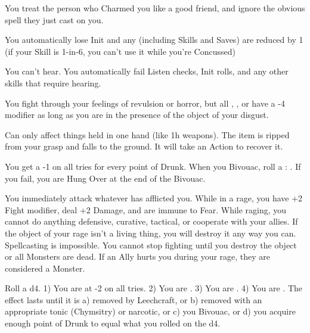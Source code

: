 {  

  You treat the person who Charmed you like a good friend, and ignore the obvious spell they just cast on you.


  You automatically lose Init and any \KNACK (including Skills and Saves) are reduced by 1 (if your Skill is 1-in-6, you can't use it while you're Concussed)


  You can't hear.  You automatically fail Listen checks, Init rolls, and any other skills that require hearing.


  You fight through your feelings of revulsion or horror, but all \RO, \RB, or \RS have a -4 modifier as long as you are in the presence of the object of your disgust.


  Can only affect things held in one hand (like 1h weapons). The item is ripped from your grasp and falls to the ground.  It will take an Action to recover it.


  You get a -1 on all \RO tries for every point of Drunk.  When you Bivouac, roll a \RS : \VIG.  If you fail, you are Hung Over at the end of the Bivouac.


  You immediately attack whatever has afflicted you. While in a rage, you have +2 Fight modifier, deal +2 Damage, and are immune to Fear. While raging, you cannot do anything defensive, curative, tactical, or cooperate with your allies. If the object of your rage isn't a living thing, you will destroy it any way you can. Spellcasting is impossible.  You cannot stop fighting until you destroy the object or all Monsters are dead.  If an Ally hurts you during your rage, they are considered a Monster.


  Roll a d4.  1) You are at -2 on all \RO tries.  2) You are .  3) You are . 4) You are .  The effect lasts until it is a) removed by Leechcraft, or b) removed with an appropriate tonic (Chymsitry) or narcotic, or c) you Bivouac, or d) you acquire enough point of Drunk to equal what you rolled on the d4.


}
